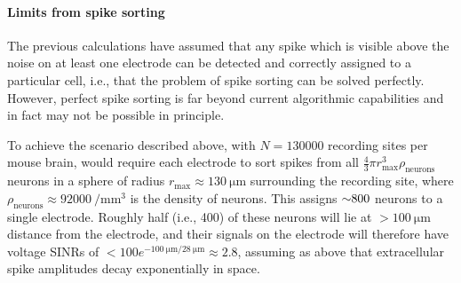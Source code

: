 \paragraph{Limits from spike sorting}

The previous calculations have assumed that any spike which is visible above the noise on at least one electrode can be detected and correctly assigned to a particular cell, i.e., that the problem of spike sorting can be solved perfectly.  
However, perfect spike sorting is far beyond current algorithmic capabilities and in fact may not be possible in principle. 

To achieve the scenario described above, with $N=\num{130000}$ recording sites per mouse brain, would require each electrode to sort spikes from all 
$\frac{4}{3} \pi r_{\text{max}}^3 \rho_{\text{neurons}}$ neurons in a sphere of radius $r_{\text{max}} \approx \SI{130}{\micro\meter}$ surrounding the recording site, where $\rho_{\text{neurons}} \approx \SI{92000}{\per\milli\meter\cubed}$ is the density of neurons. This assigns ${\sim} \num{800}$ neurons to a single electrode. Roughly half (i.e., \num{400}) of these neurons will lie at $>\SI{100}{\micro\meter}$ distance from the electrode, and their signals on the electrode will therefore have voltage SINRs of $ < \num{100} e^{-\SI{100}{\micro\meter}/\SI{28}{\micro\meter}} \approx \num{2.8}$, assuming as above that extracellular spike amplitudes decay exponentially in space.
  
